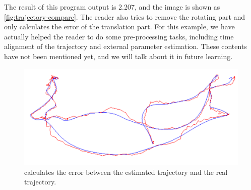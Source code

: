 The result of this program output is 2.207, and the image is shown as \autoref{fig:trajectory-compare}. The reader also tries to remove the rotating part and only calculates the error of the translation part. For this example, we have actually helped the reader to do some pre-processing tasks, including time alignment of the trajectory and external parameter estimation. These contents have not been mentioned yet, and we will talk about it in future learning.

\begin{figure}[!ht]
	\centering
	\includegraphics[width=1.0\textwidth]{chapter04/lieGroup/trajectory-compare.pdf}
	\caption{calculates the error between the estimated trajectory and the real trajectory. }
	\label{fig:trajectory-compare}
\end{figure}